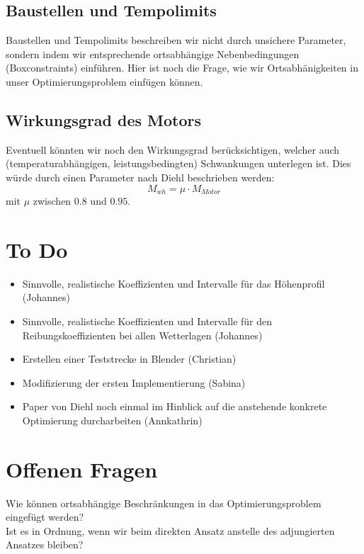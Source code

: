 \documentclass[12pt,a4paper]{article}
\theoremstyle{definition}
\theoremstyle{plain}
\begin{document}
\subsection{Baustellen und Tempolimits}
Baustellen und Tempolimits beschreiben wir nicht durch unsichere Parameter, sondern indem wir entsprechende ortsabhängige Nebenbedingungen (Boxconstraints) einführen. Hier ist noch die Frage, wie wir Ortsabhänigkeiten in unser Optimierungsproblem einfügen können.

\subsection{Wirkungsgrad des Motors}
Eventuell könnten wir noch den Wirkungsgrad berücksichtigen, welcher auch (temperaturabhängigen, leistungsbedingten) Schwankungen unterlegen ist. Dies würde durch einen Parameter nach Diehl beschrieben werden:
$$ M_{wh}=\mu\cdot M_{Motor} $$
mit $\mu$ zwischen $0.8$ und $0.95$.

\section{To Do}
\begin{itemize}
\item Sinnvolle, realistische Koeffizienten und Intervalle für das Höhenprofil (Johannes)

\item Sinnvolle, realistische Koeffizienten und Intervalle für den Reibungskoeffizienten bei allen Wetterlagen (Johannes)

\item Erstellen einer Teststrecke in Blender (Christian)

\item Modifizierung der ersten Implementierung (Sabina)

\item Paper von Diehl noch einmal im Hinblick auf die anstehende konkrete Optimierung durcharbeiten (Annkathrin)
\end{itemize}

\section{Offenen Fragen}
Wie können ortsabhängige Beschränkungen in das Optimierungsproblem eingefügt werden?\\
Ist es in Ordnung, wenn wir beim direkten Ansatz anstelle des adjungierten Ansatzes bleiben?
\end{document}
